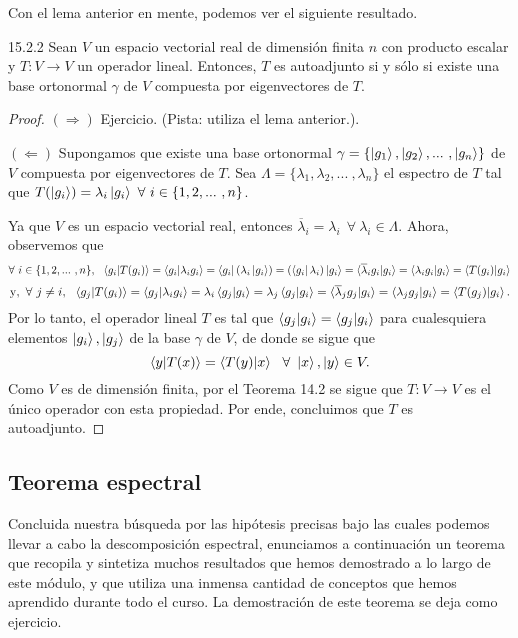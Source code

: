 \documentclass[12pt,libertine]{book}
\begin{document}
Con el lema anterior en mente, podemos ver el siguiente resultado.

\begin{Teo} {15.2.2}
    Sean $V$ un espacio vectorial real de dimensión finita $n$ con producto escalar y $T:V\to V$ un operador lineal. Entonces, $T$ es autoadjunto si y sólo si existe una base ortonormal $\gamma$ de $V$ compuesta por eigenvectores de $T$.

    \begin{proof}
    $(\Rightarrow)$ Ejercicio. (Pista: utiliza el lema anterior.).

        \vspace{3mm}
        $(\Leftarrow)$ Supongamos que existe una base ortonormal $\gamma=\{\ket{g_1}, \ket{g_2}, ... \ ,\ket{g_n}\}$ de $V$ compuesta por eigenvectores de $T$. Sea $\Lambda=\{\lambda_1,\lambda_2, ... \ ,\lambda_n\}$ el espectro de $T$ tal que $T(\ket{g_i})=\lambda_i \ket{g_i} \ \forall \ i\in\{1,2,... \ ,n\}$. 

        \vspace{3mm}
        Ya que $V$ es un espacio vectorial real, entonces $\overline{\lambda}_i = \lambda_i \ \ \forall \ \lambda_i\in\Lambda$. Ahora, observemos que \[
            \forall \ i\in \{1,2,... \ ,n\}, \ \ \braket{g_i|T(g_i)} = \braket{g_i|\lambda_i g_i} = \bra{g_i}(\lambda_i \ket{g_i}) = (\bra{g_i}\lambda_i)\ket{g_i} = \braket{\overline{\lambda}_i g_i|g_i} = \braket{\lambda_i g_i | g_i} = \braket{T(g_i)|g_i}
        \] \[
        \text{y}, \ \forall \ j\neq i, \ \ \braket{g_j|T(g_i)} = \braket{g_j|\lambda_i g_i} = \lambda_i \braket{g_j|g_i} = \lambda_j \braket{g_j|g_i} = \braket{\overline{\lambda}_j g_j|g_i} = \braket{\lambda_j g_j|g_i} = \braket{T(g_j)|g_i}.
    \] Por lo tanto, el operador lineal $T$ es tal que $\braket{g_j|g_i} = \braket{g_j|g_i}$ para cualesquiera elementos $\ket{g_i}, \ket{g_j}$ de la base $\gamma$ de $V$, de donde se sigue que \[
    \braket{y|T(x)}=\braket{T(y)|x} \ \ \forall \ \ket{x},\ket{y}\in V.
\] Como $V$ es de dimensión finita, por el Teorema 14.2 se sigue que $T:V\to V$ es el único operador con esta propiedad. Por ende, concluimos que $T$ es autoadjunto.
    \end{proof}
\end{Teo}


\subsection*{Teorema espectral}

Concluida nuestra búsqueda por las hipótesis precisas bajo las cuales podemos llevar a cabo la descomposición espectral, enunciamos a continuación un teorema que recopila y sintetiza muchos resultados que hemos demostrado a lo largo de este módulo, y que utiliza una inmensa cantidad de conceptos que hemos aprendido durante todo el curso. La demostración de este teorema se deja como ejercicio.
\end{document}
